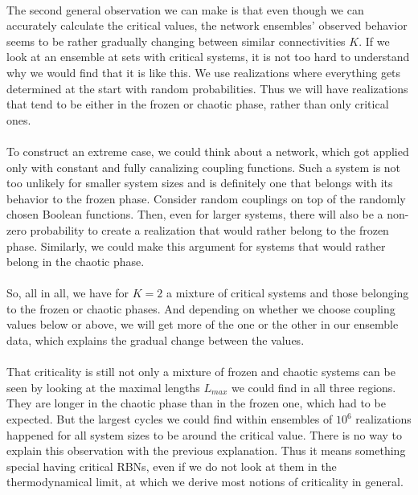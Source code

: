 \paragraph*{}
The second general observation we can make is that even though we can accurately calculate the critical values, the network ensembles' observed behavior seems to be rather gradually changing between similar connectivities $K$. If we look at an ensemble at sets with critical systems, it is not too hard to understand why we would find that it is like this. We use realizations where everything gets determined at the start with random probabilities. Thus we will have realizations that tend to be either in the frozen or chaotic phase, rather than only critical ones. 

\paragraph*{}
To construct an extreme case, we could think about a network, which got applied only with constant and fully canalizing coupling functions. Such a system is not too unlikely for smaller system sizes and is definitely one that belongs with its behavior to the frozen phase. Consider random couplings on top of the randomly chosen Boolean functions. Then, even for larger systems, there will also be a non-zero probability to create a realization that would rather belong to the frozen phase. Similarly, we could make this argument for systems that would rather belong in the chaotic phase.

\paragraph*{}
So, all in all, we have for $K=2$ a mixture of critical systems and those belonging to the frozen or chaotic phases. And depending on whether we choose coupling values below or above, we will get more of the one or the other in our ensemble data, which explains the gradual change between the values. 

\paragraph*{}
That criticality is still not only a mixture of frozen and chaotic systems can be seen by looking at the maximal lengths $L_{max}$ we could find in all three regions. They are longer in the chaotic phase than in the frozen one, which had to be expected. But the largest cycles we could find within ensembles of $10^6$ realizations happened for all system sizes to be around the critical value. There is no way to explain this observation with the previous explanation. Thus it means something special having critical RBNs, even if we do not look at them in the thermodynamical limit, at which we derive most notions of criticality in general.


